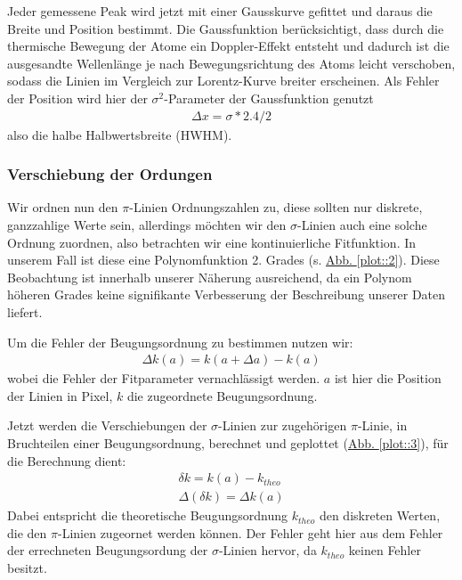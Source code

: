         Jeder gemessene Peak wird jetzt mit einer Gausskurve gefittet und daraus die Breite und Position bestimmt. Die Gaussfunktion berücksichtigt, dass durch die thermische Bewegung der Atome ein Doppler-Effekt entsteht und dadurch ist die ausgesandte Wellenlänge je nach Bewegungsrichtung des Atoms leicht verschoben, sodass die Linien im Vergleich zur Lorentz-Kurve breiter erscheinen. Als Fehler der Position wird hier der $\sigma^2$-Parameter der Gaussfunktion genutzt
        \begin{align}
          \Delta x = \sigma * 2.4 / 2
        \end{align}
        also die halbe Halbwertsbreite (HWHM).

      \subsubsection{Verschiebung der Ordungen}
        Wir ordnen nun den $\pi$-Linien Ordnungszahlen zu, diese sollten nur diskrete, ganzzahlige Werte sein, allerdings möchten wir den $\sigma$-Linien auch eine solche Ordnung zuordnen, also betrachten wir eine kontinuierliche Fitfunktion. In unserem Fall ist diese eine Polynomfunktion 2. Grades (s. \hyperref[plot::2]{Abb. \ref*{plot::2}}). Diese Beobachtung ist innerhalb unserer Näherung ausreichend, da ein Polynom höheren Grades keine signifikante Verbesserung der Beschreibung unserer Daten liefert.

        Um die Fehler der Beugungsordnung zu bestimmen nutzen wir:
        \begin{align}
          \Delta k(a) = k(a+\Delta a) - k(a)
        \end{align}
        wobei die Fehler der Fitparameter vernachlässigt werden. $a$ ist hier die Position der Linien in Pixel, $k$ die zugeordnete Beugungsordnung.

        Jetzt werden die Verschiebungen der $\sigma$-Linien zur zugehörigen $\pi$-Linie, in Bruchteilen einer Beugungsordnung, berechnet und geplottet (\hyperref[plot::3]{Abb. \ref*{plot::3}}), für die Berechnung dient:
        \begin{align}
          \delta k = k(a) - k_{theo}\\
          \Delta (\delta k) = \Delta k(a)
        \end{align}
        Dabei entspricht die theoretische Beugungsordnung $k_{theo}$ den diskreten Werten, die den $\pi$-Linien zugeornet werden können. Der Fehler geht hier aus dem Fehler der errechneten Beugungsordung der $\sigma$-Linien hervor, da $k_{theo}$ keinen Fehler besitzt.

